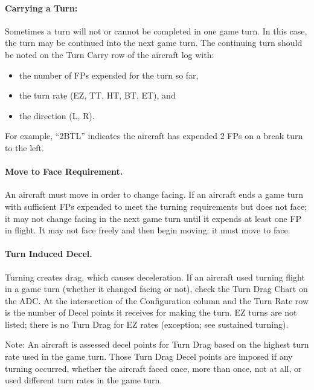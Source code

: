 \paragraph{Carrying a Turn:} Sometimes a turn will not or cannot be completed in one game turn. In this case, the turn may be continued into the next game turn. The continuing turn should be noted on the Turn Carry row of the aircraft log with:

\begin{itemize}

    \item the number of FPs expended for the turn so far,

    \item the turn rate (EZ, TT, HT, BT, ET), and

    \item the direction (L, R).

\end{itemize}

For example, “2BTL” indicates the aircraft has expended 2 FPs on a break turn to the left.

\paragraph{Move to Face Requirement.} An aircraft must move in order to change facing. If an aircraft ends a game turn with sufficient FPs expended to meet the turning requirements but does not face; it may not change facing in the next game turn until it expends at least one FP in flight.  It may not face freely and then begin moving; it must move to face.

\paragraph{Turn Induced Decel.} Turning creates drag, which causes deceleration. If an aircraft used turning flight in a game turn (whether it changed facing or not), check the Turn Drag Chart on the ADC. At the intersection of the Configuration column and the Turn Rate row is the number of Decel points it receives for making the turn. EZ turns are not listed; there is no Turn Drag for EZ rates (exception; see sustained turning). 

Note: An aircraft is assessed decel points for Turn Drag based on the highest turn rate used in the game turn. Those Turn Drag Decel points are imposed if any turning occurred, whether the aircraft faced once, more than once, not at all, or used different turn rates in the game turn.

